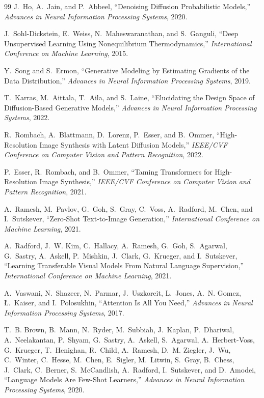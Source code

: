 \documentclass[11pt,a4paper]{article}
\theoremstyle{definition}
\theoremstyle{remark}
\begin{document}
\begin{thebibliography}{99}
J.~Ho, A.~Jain, and P.~Abbeel,
\newblock ``Denoising Diffusion Probabilistic Models,''
\newblock \emph{Advances in Neural Information Processing Systems}, 2020.

J.~Sohl-Dickstein, E.~Weiss, N.~Maheswaranathan, and S.~Ganguli,
\newblock ``Deep Unsupervised Learning Using Nonequilibrium Thermodynamics,''
\newblock \emph{International Conference on Machine Learning}, 2015.

Y.~Song and S.~Ermon,
\newblock ``Generative Modeling by Estimating Gradients of the Data Distribution,''
\newblock \emph{Advances in Neural Information Processing Systems}, 2019.

T.~Karras, M.~Aittala, T.~Aila, and S.~Laine,
\newblock ``Elucidating the Design Space of Diffusion-Based Generative Models,''
\newblock \emph{Advances in Neural Information Processing Systems}, 2022.

R.~Rombach, A.~Blattmann, D.~Lorenz, P.~Esser, and B.~Ommer,
\newblock ``High-Resolution Image Synthesis with Latent Diffusion Models,''
\newblock \emph{IEEE/CVF Conference on Computer Vision and Pattern Recognition}, 2022.

P.~Esser, R.~Rombach, and B.~Ommer,
\newblock ``Taming Transformers for High-Resolution Image Synthesis,''
\newblock \emph{IEEE/CVF Conference on Computer Vision and Pattern Recognition}, 2021.

A.~Ramesh, M.~Pavlov, G.~Goh, S.~Gray, C.~Voss, A.~Radford, M.~Chen, and I.~Sutskever,
\newblock ``Zero-Shot Text-to-Image Generation,''
\newblock \emph{International Conference on Machine Learning}, 2021.

A.~Radford, J.~W. Kim, C.~Hallacy, A.~Ramesh, G.~Goh, S.~Agarwal, G.~Sastry, A.~Askell, P.~Mishkin, J.~Clark, G.~Krueger, and I.~Sutskever,
\newblock ``Learning Transferable Visual Models From Natural Language Supervision,''
\newblock \emph{International Conference on Machine Learning}, 2021.

A.~Vaswani, N.~Shazeer, N.~Parmar, J.~Uszkoreit, L.~Jones, A.~N. Gomez, \L.~Kaiser, and I.~Polosukhin,
\newblock ``Attention Is All You Need,''
\newblock \emph{Advances in Neural Information Processing Systems}, 2017.

T.~B. Brown, B.~Mann, N.~Ryder, M.~Subbiah, J.~Kaplan, P.~Dhariwal, A.~Neelakantan, P.~Shyam, G.~Sastry, A.~Askell, S.~Agarwal, A.~Herbert-Voss, G.~Krueger, T.~Henighan, R.~Child, A.~Ramesh, D.~M. Ziegler, J.~Wu, C.~Winter, C.~Hesse, M.~Chen, E.~Sigler, M.~Litwin, S.~Gray, B.~Chess, J.~Clark, C.~Berner, S.~McCandlish, A.~Radford, I.~Sutskever, and D.~Amodei,
\newblock ``Language Models Are Few-Shot Learners,''
\newblock \emph{Advances in Neural Information Processing Systems}, 2020.


\end{thebibliography}
\end{document}
